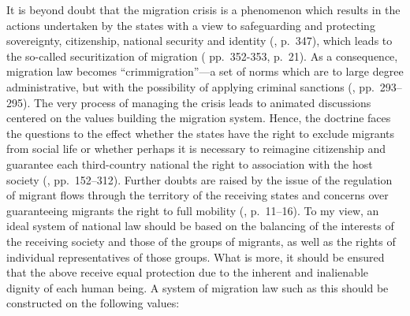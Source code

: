 \documentclass[10pt,a4paper]{article}
\begin{document}
\begin{multicols}{2}
It is beyond doubt that the migration crisis is a phenomenon which results in the actions undertaken by the states with a view to safeguarding and protecting sovereignty, citizenship, national security and identity (\citep{R12}, p.~347), which leads to the so-called securitization of migration (\citep{R12} pp.~352-353, \citep{R13} p.~21). As a consequence, migration law becomes ``crimmigration''---a set of norms which are to large degree administrative, but with the possibility of applying criminal sanctions (\citep{R14}, pp.~293--295). The very process of managing the crisis leads to animated discussions centered on the values building the migration system. Hence, the doctrine faces the questions to the effect whether the states have the right to exclude migrants from social life or whether perhaps it is necessary to reimagine citizenship and guarantee each third-country national the right to association with the host society (\citep{R15}, pp.~152--312). Further doubts are raised by the issue of the regulation of migrant flows through the territory of the receiving states and concerns over guaranteeing migrants the right to full mobility (\citep{R16}, p.~11--16). To my view, an ideal system of national law should be based on the balancing of the interests of the receiving society and those of the groups of migrants, as well as the rights of individual representatives of those groups. What is more, it should be ensured that the above receive equal protection due to the inherent and inalienable dignity of each human being. A system of migration law such as this should be constructed on the following values:


\end{multicols}
\end{document}
